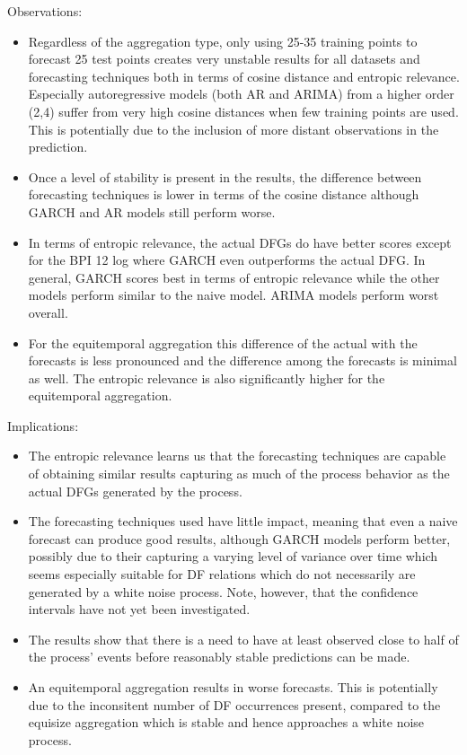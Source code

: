 Observations:
\begin{itemize}
    \item Regardless of the aggregation type, only using 25-35 training points to forecast 25 test points creates very unstable results for all datasets and forecasting techniques both in terms of cosine distance and entropic relevance. Especially autoregressive models (both AR and ARIMA) from a higher order (2,4) suffer from very high cosine distances when few training points are used. 
    This is potentially due to the inclusion of more distant observations in the prediction.
    \item Once a level of stability is present in the results, the difference between forecasting techniques is lower in terms of the cosine distance although GARCH and AR models still perform worse. 
    \item In terms of entropic relevance, the actual DFGs do have better scores except for the BPI 12 log where GARCH even outperforms the actual DFG. In general, GARCH scores best in terms of entropic relevance while the other models perform similar to the naive model. ARIMA models perform worst overall.
    \item For the equitemporal aggregation this difference of the actual with the forecasts is less pronounced and the difference among the forecasts is minimal as well. 
    The entropic relevance is also significantly higher for the equitemporal aggregation.
\end{itemize}

Implications:
\begin{itemize}
    \item The entropic relevance learns us that the forecasting techniques are capable of obtaining similar results capturing as much of the process behavior as the actual DFGs generated by the process.
    \item The forecasting techniques used have little impact, meaning that even a naive forecast can produce good results, although GARCH models perform better, possibly due to their capturing a varying level of variance over time which seems especially suitable for DF relations which do not necessarily are generated by a white noise process. Note, however, that the confidence intervals have not yet been investigated.
    \item The results show that there is a need to have at least observed close to half of the process' events before reasonably stable predictions can be made.
    \item An equitemporal aggregation results in worse forecasts. This is potentially due to the inconsitent number of DF occurrences present, compared to the equisize aggregation which is stable and hence approaches a white noise process.
\end{itemize}

